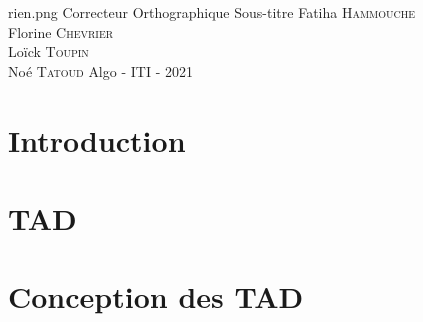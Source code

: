 \documentclass{article}
\begin{document}
\PageDeGarde	
{rien.png} %
{Correcteur Orthographique} %
{Sous-titre} %
{Fatiha \textsc{Hammouche} \\
Florine \textsc{Chevrier} \\
Loïck \textsc{Toupin} \\
Noé \textsc{Tatoud}}
{Algo - ITI - 2021} %



\tableofcontents

\clearpage
\section{Introduction}

\clearpage
\section{TAD}
	


\clearpage
\section{Conception des TAD}
	
\end{document}
